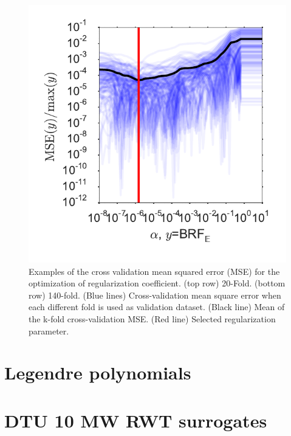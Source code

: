 \documentclass[preprint,12pt]{elsarticle}
\begin{document}
\begin{figure}[h!]
\begin{centering}
\includegraphics[width=0.32\columnwidth]{Figures/Surrgotes_140-fold/CrossValidation_BRFBM_EFL_M12_E_PCE.pdf}
\caption{Examples of the cross validation mean squared error (MSE) for the optimization of regularization coefficient. (top row) 20-Fold. (bottom row) 140-fold. (Blue lines) Cross-validation mean square error when each different fold is used as validation dataset. (Black line) Mean of the k-fold cross-validation MSE. (Red line) Selected regularization parameter.}
\label{fig_20fold}
\end{centering}
\end{figure}


\section{Legendre polynomials}
\label{app_leg_poly}
\small


\section{DTU 10 MW RWT surrogates}
\label{app_surrogates}
\small
\end{document}
